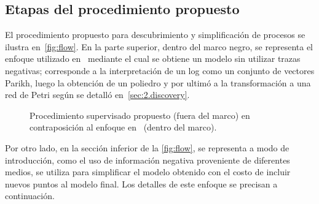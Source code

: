 \subsection{Etapas del procedimiento propuesto}
\label{sec:3.algodisco stages}

El procedimiento propuesto para descubrimiento y simplificación de procesos se ilustra en~\autoref{fig:flow}.
En la parte superior, dentro del marco negro, se representa el enfoque utilizado en~\cite{CarmonaC14} 
mediante el cual se obtiene un modelo sin utilizar trazas negativas; corresponde a la interpretación
de un log como un conjunto de vectores Parikh, luego la obtención de un poliedro y por ultimó a la 
transformación a una red de Petri según se detalló en~\autoref{sec:2.discovery}.

\begin{figure}[H]
    \begin{center}
    \caption{Procedimiento supervisado propuesto (fuera del marco) en contraposición al enfoque
        en~\cite{CarmonaC14} (dentro del marco).}
    \label{fig:flow}
    \end{center}
\end{figure}

Por otro lado, en la sección inferior de la \autoref{fig:flow}, se representa a modo de introducción,
como el uso de información negativa proveniente de diferentes medios, se utiliza para simplificar 
el modelo obtenido con el costo de incluir nuevos puntos al modelo final.
Los detalles de este enfoque se precisan a continuación.

